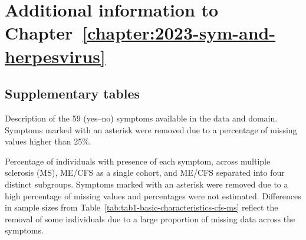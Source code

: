 \chapter{Additional information to Chapter~\ref{chapter:2023-sym-and-herpesvirus}}
\label{appendix:2023-sym-and-herpesvirus}

\section{Supplementary tables}


\begin{table}[h]
    \centering
    \caption[Description of the 59 (yes--no) symptoms available in the data and domain]{Description of the 59 (yes--no) symptoms available in the data and domain. Symptoms marked with an asterisk were removed due to a percentage of missing values higher than 25\%.}
    \resizebox{\linewidth}{!}{}
    \label{appendix:taba1-sym-bin-description}
\end{table}

\begin{table}[h]
    \centering
    \caption[Percentage of individuals with presence of each symptom, across multiple sclerosis, ME/CFS as a single cohort, and ME/CFS separated into four distinct subgroups]{Percentage of individuals with presence of each symptom, across multiple sclerosis (MS), ME/CFS as a single cohort, and ME/CFS separated into four distinct subgroups. Symptoms marked with an asterisk were removed due to a high percentage of missing values and percentages were not estimated. Differences in sample sizes from Table~\ref{tab:tab1-basic-characteristics-cfs-ms} reflect the removal of some individuals due to a large proportion of missing data across the symptoms.}
    \resizebox{0.6\linewidth}{!}{}
    \label{appendix:taba2-percentage-sym-bin}
\end{table}


